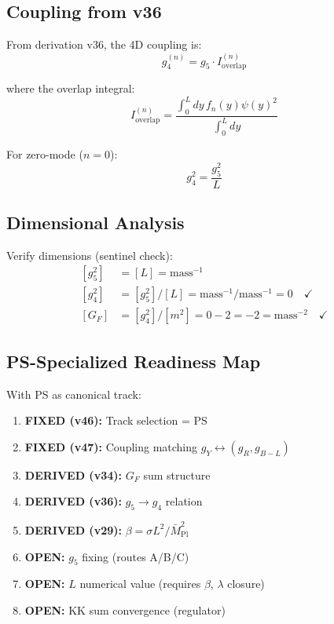 \documentclass[11pt,a4paper]{article}
\begin{document}
\subsection{Coupling from v36}
\label{subsec:v36-coupling}

From derivation v36, the 4D coupling is:
\begin{equation}
\label{eq:g4-from-g5}
g_4^{(n)} = g_5 \cdot I_{\text{overlap}}^{(n)}
\end{equation}

where the overlap integral:
\begin{equation}
\label{eq:overlap-integral}
I_{\text{overlap}}^{(n)} = \frac{\int_0^L dy \, f_n(y) \psi(y)^2}{\int_0^L dy}
\end{equation}

For zero-mode ($n = 0$):
\begin{equation}
\label{eq:zero-mode-coupling}
g_4^2 = \frac{g_5^2}{L}
\end{equation}

\subsection{Dimensional Analysis}
\label{subsec:gf-dimensions}

Verify dimensions (sentinel check):
\begin{align}
\label{eq:dim-g5}
[g_5^2] &= [L] = \text{mass}^{-1} \\
\label{eq:dim-g4}
[g_4^2] &= [g_5^2] / [L] = \text{mass}^{-1} / \text{mass}^{-1} = 0 \quad \checkmark \\
\label{eq:dim-gf}
[G_F] &= [g_4^2] / [m^2] = 0 - 2 = -2 = \text{mass}^{-2} \quad \checkmark
\end{align}

\subsection{PS-Specialized Readiness Map}
\label{subsec:ps-readiness}

With PS as canonical track:

\begin{enumerate}
\item \textbf{FIXED (v46):} Track selection = PS
\item \textbf{FIXED (v47):} Coupling matching $g_Y \leftrightarrow (g_R, g_{B-L})$
\item \textbf{DERIVED (v34):} $G_F$ sum structure
\item \textbf{DERIVED (v36):} $g_5 \to g_4$ relation
\item \textbf{DERIVED (v29):} $\beta = \sigma L^2 / \bar{M}_{\text{Pl}}^2$
\item \textbf{OPEN:} $g_5$ fixing (routes A/B/C)
\item \textbf{OPEN:} $L$ numerical value (requires $\beta$, $\lambda$ closure)
\item \textbf{OPEN:} KK sum convergence (regulator)
\end{enumerate}
\end{document}
